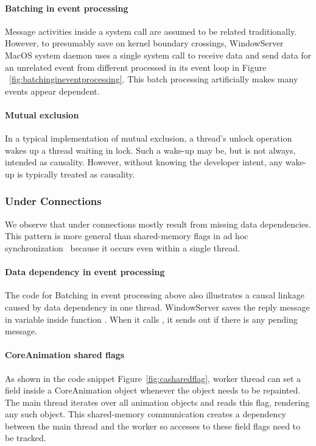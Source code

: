 \paragraph{Batching in event processing}

Message activities inside a system call are assumed to be related traditionally.
However, to presumably save on kernel boundary crossings, WindowServer MacOS
system daemon uses a single system call to receive data and send data for
an unrelated event from different processed in its event loop in Figure
~\ref{fig:batchingineventprocessing}. This batch processing artificially makes
many events appear dependent.

\paragraph{Mutual exclusion}

In a typical implementation of mutual exclusion, a thread's unlock operation
wakes up a thread waiting in lock. Such a wake-up may be, but is not always,
intended as causality. However, without knowing the developer intent, any
wake-up is typically treated as causality. %

\subsubsection{Under Connections}\label{subsec:underconnections}

We observe that under connections mostly result from missing data
dependencies.  This pattern is more general than shared-memory flags in ad
hoc synchronization~\cite{xiong2010ad} because it occurs even within a
single thread.

\paragraph{Data dependency in event processing}
The code for Batching in event processing above also illustrates a causal
linkage caused by data dependency in one thread. WindowServer saves the reply
message in variable  inside function .
When it calls , it sends out  if there is
any pending message.

\paragraph{CoreAnimation shared flags}
As shown in the code snippet Figure~\ref{fig:casharedflag}, worker thread can set a
field  inside a CoreAnimation object whenever the object needs
to be repainted. The main thread iterates over all animation objects and reads
this flag, rendering any such object. This shared-memory communication creates
a dependency between the main thread and the worker so accesses to these field
flags need to be tracked.

